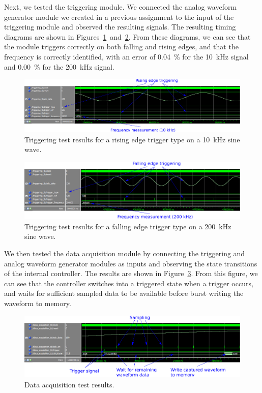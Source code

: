 \documentclass[journal]{IEEEtran}
\begin{document}
Next, we tested the triggering module. We connected the analog waveform generator module we created in a previous assignment to the input of the triggering module and observed the resulting signals. The resulting timing diagrams are shown in Figures~\ref{fig:trigger_test_1}~and~\ref{fig:trigger_test_2}. From these diagrams, we can see that the module triggers correctly on both falling and rising edges, and that the frequency is correctly identified, with an error of 0.04~\% for the 10~kHz signal and 0.00~\% for the 200~kHz signal.

\begin{figure}[!htb]
  \centering
  \includegraphics[width=\columnwidth]{test-results/trigger_test_rising_10kHz.png}
  \caption{Triggering test results for a rising edge trigger type on a 10~kHz sine wave.}
  \label{fig:trigger_test_1}
\end{figure}

\begin{figure}[!htb]
  \centering
  \includegraphics[width=\columnwidth]{test-results/trigger_test_falling_200kHz.png}
  \caption{Triggering test results for a falling edge trigger type on a 200~kHz sine wave.}
  \label{fig:trigger_test_2}
\end{figure}

We then tested the data acquisition module by connecting the triggering and analog waveform generator modules as inputs and observing the state transitions of the internal controller. The results are shown in Figure~\ref{fig:data_acq_test}. From this figure, we can see that the controller switches into a triggered state when a trigger occurs, and waits for sufficient sampled data to be available before burst writing the waveform to memory.

\begin{figure}[!htb]
  \centering
  \includegraphics[width=\columnwidth]{test-results/data_acquisition_test.png}
  \caption{Data acquisition test results.}
  \label{fig:data_acq_test}
\end{figure}
\end{document}

